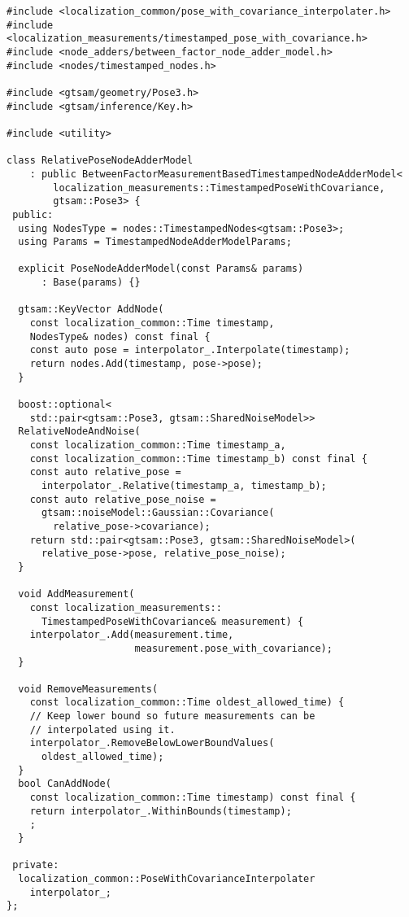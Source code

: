 \begin{verbatim}
#include <localization_common/pose_with_covariance_interpolater.h>
#include <localization_measurements/timestamped_pose_with_covariance.h>
#include <node_adders/between_factor_node_adder_model.h>
#include <nodes/timestamped_nodes.h>

#include <gtsam/geometry/Pose3.h>
#include <gtsam/inference/Key.h>

#include <utility>

class RelativePoseNodeAdderModel
    : public BetweenFactorMeasurementBasedTimestampedNodeAdderModel<
        localization_measurements::TimestampedPoseWithCovariance,
        gtsam::Pose3> {
 public:
  using NodesType = nodes::TimestampedNodes<gtsam::Pose3>;
  using Params = TimestampedNodeAdderModelParams;

  explicit PoseNodeAdderModel(const Params& params)
      : Base(params) {}

  gtsam::KeyVector AddNode(
    const localization_common::Time timestamp,
    NodesType& nodes) const final {
    const auto pose = interpolator_.Interpolate(timestamp);
    return nodes.Add(timestamp, pose->pose);
  }

  boost::optional<
    std::pair<gtsam::Pose3, gtsam::SharedNoiseModel>>
  RelativeNodeAndNoise(
    const localization_common::Time timestamp_a,
    const localization_common::Time timestamp_b) const final {
    const auto relative_pose =
      interpolator_.Relative(timestamp_a, timestamp_b);
    const auto relative_pose_noise =
      gtsam::noiseModel::Gaussian::Covariance(
        relative_pose->covariance);
    return std::pair<gtsam::Pose3, gtsam::SharedNoiseModel>(
      relative_pose->pose, relative_pose_noise);
  }

  void AddMeasurement(
    const localization_measurements::
      TimestampedPoseWithCovariance& measurement) {
    interpolator_.Add(measurement.time,
                      measurement.pose_with_covariance);
  }

  void RemoveMeasurements(
    const localization_common::Time oldest_allowed_time) {
    // Keep lower bound so future measurements can be
    // interpolated using it.
    interpolator_.RemoveBelowLowerBoundValues(
      oldest_allowed_time);
  }
  bool CanAddNode(
    const localization_common::Time timestamp) const final {
    return interpolator_.WithinBounds(timestamp);
    ;
  }

 private:
  localization_common::PoseWithCovarianceInterpolater
    interpolator_;
};
\end{verbatim}